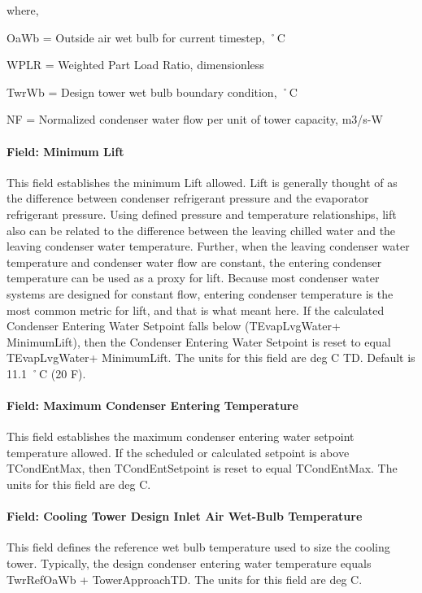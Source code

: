where,

OaWb = Outside air wet bulb for current timestep, ˚C

WPLR = Weighted Part Load Ratio, dimensionless

TwrWb = Design tower wet bulb boundary condition, ˚C

NF = Normalized condenser water flow per unit of tower capacity, m3/s-W

\paragraph{Field: Minimum Lift}\label{field-minimum-lift}

This field establishes the minimum Lift allowed. Lift is generally thought of as the difference between condenser refrigerant pressure and the evaporator refrigerant pressure. Using defined pressure and temperature relationships, lift also can be related to the difference between the leaving chilled water and the leaving condenser water temperature. Further, when the leaving condenser water temperature and condenser water flow are constant, the entering condenser temperature can be used as a proxy for lift. Because most condenser water systems are designed for constant flow, entering condenser temperature is the most common metric for lift, and that is what meant here. If the calculated Condenser Entering Water Setpoint falls below (TEvapLvgWater+ MinimumLift), then the Condenser Entering Water Setpoint is reset to equal TEvapLvgWater+ MinimumLift. The units for this field are deg C TD. Default is 11.1 ˚C (20 F).

\paragraph{Field: Maximum Condenser Entering Temperature}\label{field-maximum-condenser-entering-temperature}

This field establishes the maximum condenser entering water setpoint temperature allowed. If the scheduled or calculated setpoint is above TCondEntMax, then TCondEntSetpoint is reset to equal TCondEntMax. The units for this field are deg C.

\paragraph{Field: Cooling Tower Design Inlet Air Wet-Bulb Temperature}\label{field-cooling-tower-design-inlet-air-wet-bulb-temperature}

This field defines the reference wet bulb temperature used to size the cooling tower. Typically, the design condenser entering water temperature equals TwrRefOaWb + TowerApproachTD. The units for this field are deg C.

